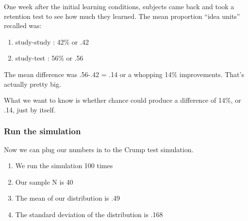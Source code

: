 \documentclass[
]{book}
\providecommand{\tightlist}{%
  \setlength{\itemsep}{0pt}\setlength{\parskip}{0pt}}
\begin{document}
One week after the initial learning conditions, subjects came back and took a retention test to see how much they learned. The mean proportion ``idea units'' recalled was:

\begin{enumerate}
\def\labelenumi{\arabic{enumi}.}
\tightlist
\item
  study-study : 42\% or .42
\item
  study-test : 56\% or .56
\end{enumerate}

The mean difference was .56-.42 = .14 or a whopping 14\% improvements. That's actually pretty big.

What we want to know is whether chance could produce a difference of 14\%, or .14, just by itself.

\hypertarget{run-the-simulation}{%
\subsubsection{Run the simulation}\label{run-the-simulation}}

Now we can plug our numbers in to the Crump test simulation.

\begin{enumerate}
\def\labelenumi{\arabic{enumi}.}
\tightlist
\item
  We run the simulation 100 times
\item
  Our sample N is 40
\item
  The mean of our distribution is .49
\item
  The standard deviation of the distribution is .168
\end{enumerate}
\end{document}
